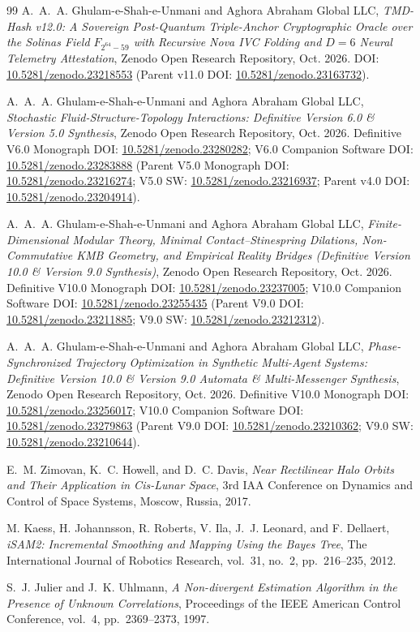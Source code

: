 \documentclass[11pt,a4paper,reqno]{article}
\def\texttt#1{#1}%
\def\mathbb#1{#1}%
\newcommand{\zenodo}[1]{\href{https://doi.org/10.5281/zenodo.#1}{\texttt{10.5281/\allowbreak zenodo.#1}}}
\theoremstyle{plain}
\theoremstyle{definition}
\theoremstyle{remark}
\numberwithin{equation}{section}
\begin{document}
\begin{thebibliography}{99}
A.~A.~A. Ghulam-e-Shah-e-Unmani and {Aghora Abraham Global LLC},
\emph{TMD-Hash v12.0: A Sovereign Post-Quantum Triple-Anchor Cryptographic Oracle over the Solinas Field $\mathbb{F}_{2^{64}-59}$ with Recursive Nova IVC Folding and $D=6$ Neural Telemetry Attestation},
Zenodo Open Research Repository, Oct. 2026.
DOI: \zenodo{23218553} (Parent v11.0 DOI: \zenodo{23163732}).

A.~A.~A. Ghulam-e-Shah-e-Unmani and {Aghora Abraham Global LLC},
\emph{Stochastic Fluid-Structure-Topology Interactions: Definitive Version 6.0 \& Version 5.0 Synthesis},
Zenodo Open Research Repository, Oct. 2026.
Definitive V6.0 Monograph DOI: \zenodo{23280282}; V6.0 Companion Software DOI: \zenodo{23283888} (Parent V5.0 Monograph DOI: \zenodo{23216274}; V5.0 SW: \zenodo{23216937}; Parent v4.0 DOI: \zenodo{23204914}).

A.~A.~A. Ghulam-e-Shah-e-Unmani and {Aghora Abraham Global LLC},
\emph{Finite-Dimensional Modular Theory, Minimal Contact--Stinespring Dilations, Non-Commutative KMB Geometry, and Empirical Reality Bridges (Definitive Version 10.0 \& Version 9.0 Synthesis)},
Zenodo Open Research Repository, Oct. 2026.
Definitive V10.0 Monograph DOI: \zenodo{23237005}; V10.0 Companion Software DOI: \zenodo{23255435} (Parent V9.0 DOI: \zenodo{23211885}; V9.0 SW: \zenodo{23212312}).

A.~A.~A. Ghulam-e-Shah-e-Unmani and {Aghora Abraham Global LLC},
\emph{Phase-Synchronized Trajectory Optimization in Synthetic Multi-Agent Systems: Definitive Version 10.0 \& Version 9.0 Automata \& Multi-Messenger Synthesis},
Zenodo Open Research Repository, Oct. 2026.
Definitive V10.0 Monograph DOI: \zenodo{23256017}; V10.0 Companion Software DOI: \zenodo{23279863} (Parent V9.0 DOI: \zenodo{23210362}; V9.0 SW: \zenodo{23210644}).

E.~M. Zimovan, K.~C. Howell, and D.~C. Davis,
\emph{Near Rectilinear Halo Orbits and Their Application in Cis-Lunar Space},
3rd IAA Conference on Dynamics and Control of Space Systems, Moscow, Russia, 2017.

M. Kaess, H. Johannsson, R. Roberts, V. Ila, J.~J. Leonard, and F. Dellaert,
\emph{iSAM2: Incremental Smoothing and Mapping Using the Bayes Tree},
The International Journal of Robotics Research, vol.~31, no.~2, pp.~216--235, 2012.

S.~J. Julier and J.~K. Uhlmann,
\emph{A Non-divergent Estimation Algorithm in the Presence of Unknown Correlations},
Proceedings of the IEEE American Control Conference, vol.~4, pp.~2369--2373, 1997.


\end{thebibliography}
\end{document}
